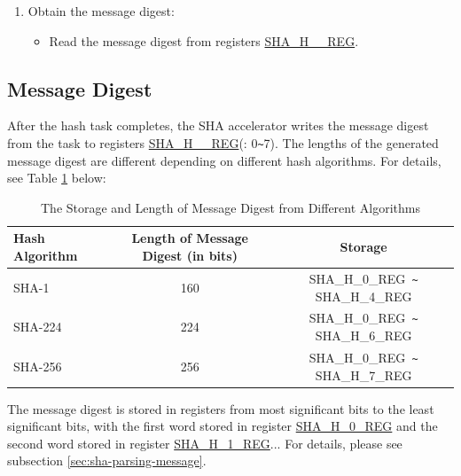 \documentclass[main\_\_EN.tex]{subfiles}
\begin{document}
\begin{enumerate}
    \item Obtain the message digest:
    \begin{itemize}
        \item Read the message digest from registers \hyperref[regdesc:SHAHNREG]{SHA\_H\_\_REG}.
    \end{itemize}
\end{enumerate}

\subsection{Message Digest}

After the hash task completes, the SHA accelerator writes the message digest from the task to registers \hyperref[regdesc:SHAHNREG]{SHA\_H\_\_REG}(: 0\verb+~+7). The lengths of the generated message digest are different depending on different hash algorithms. For details, see Table \ref{tab:sha-message-digest} below:


\begin{table}[H]
    \centering
    \caption{The Storage and Length of Message Digest from Different Algorithms}
    \label{tab:sha-message-digest}
    \begin{threeparttable}
    \begin{tabular}{ | l | c | c |}
    \hline
        \rowcolor{lightgray}
        \textbf{Hash Algorithm} & \textbf{Length of Message Digest (in bits)} & \textbf{Storage\tnote{1}} \\\hline
        SHA-1 & 160 & SHA\_H\_0\_REG\verb+ ~ +SHA\_H\_4\_REG \\\hline
        SHA-224 & 224 & SHA\_H\_0\_REG\verb+ ~ +SHA\_H\_6\_REG \\\hline
        SHA-256 & 256 & SHA\_H\_0\_REG\verb+ ~ +SHA\_H\_7\_REG \\\hline
    \end{tabular}

    \begin{tablenotes}
        \item[1] The message digest is stored in registers from most significant bits to the least significant bits, with the first word stored in register \hyperref[regdesc:SHAHNREG]{SHA\_H\_0\_REG} and the second word stored in register \hyperref[regdesc:SHAHNREG]{SHA\_H\_1\_REG}... For details, please see subsection \ref{sec:sha-parsing-message}.
    \end{tablenotes}

    \end{threeparttable}
\end{table}
\end{document}
